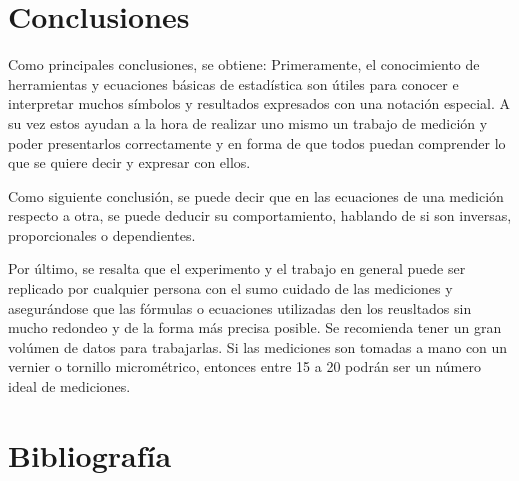 \documentclass[%
 reprint,
groupedaddress,
unsortedaddress,
 amsmath,amssymb,
 aps,
superscriptaddress
]{revtex4-2}
\begin{document}
\section{Conclusiones}
\label{Sec:Concl}

Como principales conclusiones, se obtiene:
Primeramente, el conocimiento de herramientas y ecuaciones básicas de estadística son útiles para conocer e interpretar muchos símbolos y resultados expresados con una notación especial. A su vez estos ayudan a la hora de realizar uno mismo un trabajo de medición y poder presentarlos correctamente y en forma de que todos puedan comprender lo que se quiere decir y expresar con ellos.

Como siguiente conclusión, se puede decir que en las ecuaciones de una medición respecto a otra, se puede deducir su comportamiento, hablando de si son inversas, proporcionales o dependientes.

Por último, se resalta que el experimento y el trabajo en general puede ser replicado por cualquier persona con el sumo cuidado de las mediciones y asegurándose que las fórmulas o ecuaciones utilizadas den los reusltados sin mucho redondeo y de la forma más precisa posible. Se recomienda tener un gran volúmen de datos para trabajarlas. Si las mediciones son tomadas a mano con un vernier o tornillo micrométrico, entonces entre 15 a 20 podrán ser un número ideal de mediciones.


\section{Bibliografía}


\cite{cervantes2008media}
\cite{trabajopasado}
\end{document}
